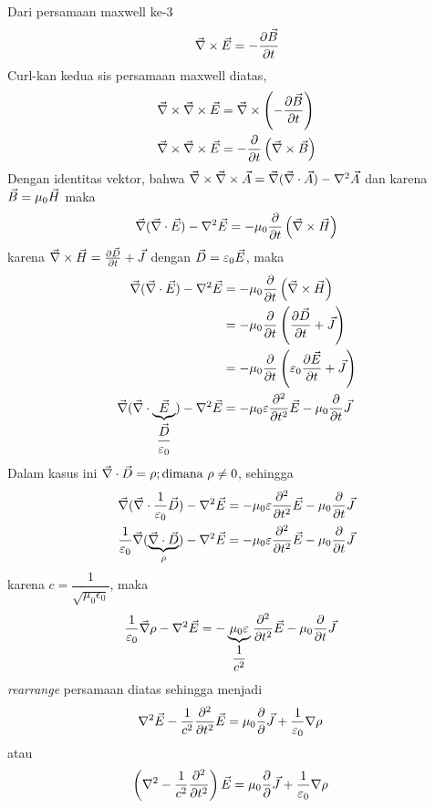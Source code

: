 Dari persamaan maxwell ke-3
\begin{equation*}
    \vec{\nabla} \times \vec{E} = -\frac{\partial \vec{B}}{\partial t}
\end{equation*}
Curl-kan kedua sis persamaan maxwell diatas,
\begin{align*}
    \vec{\nabla} \times \vec{\nabla} \times \vec{E} &= \vec{\nabla} \times \left(-\frac{\partial \vec{B}}{\partial t}\right)\\
    \vec{\nabla} \times \vec{\nabla} \times \vec{E} &=  -\frac{\partial}{\partial t}\left(\vec{\nabla} \times \vec{B} \right) \\
\end{align*}
Dengan identitas vektor, bahwa $\vec{\nabla} \times \vec{\nabla} \times \vec{A}=\vec{\nabla}(\vec{\nabla}\cdot\vec{A})-\nabla^2 \vec{A}$ dan karena $\vec{B} = \mu_0 \vec{H}$ maka
\begin{align*}
    \vec{\nabla}(\vec{\nabla}\cdot\vec{E})-\nabla^2\vec{E}=-\mu_0 \frac{\partial }{\partial t}\left(\vec{\nabla} \times \vec{H}\right) 
\end{align*}
karena $\vec{\nabla} \times \vec{H} = \frac{\partial \vec{D}}{\partial t} + \vec{J}$ dengan $\vec{D} = \varepsilon_0 \vec{E}$, maka
\begin{align*}
    \vec{\nabla}(\vec{\nabla}\cdot\vec{E})-\nabla^2\vec{E}&=-\mu_0 \frac{\partial }{\partial t}\left(\vec{\nabla} \times \vec{H}\right)\\
    &=-\mu_0 \frac{\partial }{\partial t}\left(\frac{\partial \vec{D}}{\partial t}+\vec{J}\right) \\
    &=-\mu_0 \frac{\partial }{\partial t}\left(\varepsilon_0\frac{\partial \vec{E}}{\partial t}+\vec{J}\right) \\
    \vec{\nabla}(\vec{\nabla}\cdot\underbrace{\vec{E}}_{\dfrac{\vec{D}}{\varepsilon_0}})-\nabla^2\vec{E}&=-\mu_0\varepsilon \frac{\partial^2 }{\partial t^2}\vec{E}-\mu_0\frac{\partial }{\partial t}\vec{J}
\end{align*}
Dalam kasus ini $\vec{\nabla} \cdot \vec{D} = \rho; \text{dimana } \rho \neq 0$, sehingga
\begin{align*}
    \vec{\nabla}(\vec{\nabla}\cdot\frac{1}{\varepsilon_0}\vec{D})-\nabla^2\vec{E}&=-\mu_0\varepsilon \frac{\partial^2 }{\partial t^2}\vec{E}-\mu_0\frac{\partial }{\partial t}\vec{J}\\
    \frac{1}{\varepsilon_0}\vec{\nabla}(\underbrace{\vec{\nabla}\cdot\vec{D}}_{\rho})-\nabla^2\vec{E}&=-\mu_0\varepsilon \frac{\partial^2 }{\partial t^2}\vec{E}-\mu_0\frac{\partial }{\partial t}\vec{J}\\
\end{align*}
karena $c=\dfrac{1}{\sqrt{\mu_0\epsilon_0}}$, maka
\begin{align*}
    \frac{1}{\varepsilon_0}\vec{\nabla}\rho-\nabla^2\vec{E}&=-\underbrace{\mu_0\varepsilon}_{\dfrac{1}{c^2}} \frac{\partial^2 }{\partial t^2}\vec{E}-\mu_0\frac{\partial }{\partial t}\vec{J}
\end{align*}
\textit{rearrange} persamaan diatas sehingga menjadi
\begin{align*}
    \nabla^2\vec{E}-\frac{1}{c^2}\frac{\partial^2 }{\partial t^2}\vec{E}&=\mu_0\frac{\partial}{\partial}\vec{J} + \frac{1}{\varepsilon_0}\nabla\rho
\end{align*}
atau
\begin{align*}
    \left(\nabla^2-\frac{1}{c^2}\frac{\partial^2 }{\partial t^2}\right)\vec{E}&=\mu_0\frac{\partial}{\partial}\vec{J} + \frac{1}{\varepsilon_0}\nabla\rho
\end{align*}